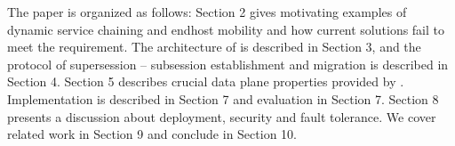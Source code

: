 \begin{comment}
\item \textbf{Endpoint mobility   and multihoming:} Today's  end hosts
  change locations frequently due to device mobility and VM migration.
  In addition, newer  protocols   allow end devices to   use  multiple
  interfaces. We also need to address how  to seamlessly integrate end
  hosts mobility protocols and this MBP.

\end{itemize}
\end{comment}



The paper is organized as follows:
Section 2 gives motivating examples of dynamic service chaining and endhost mobility and how current solutions fail to meet the requirement. 
The architecture of \system is described in Section 3, and the protocol of supersession -- subsession establishment and migration is described in Section 4. 
Section 5 describes crucial data plane properties provided by \system. 
Implementation is described in Section 7 and evaluation in Section 7. 
Section 8 presents a discussion about deployment, security and fault tolerance. 
We cover related work in Section 9 and conclude in Section 10.   

